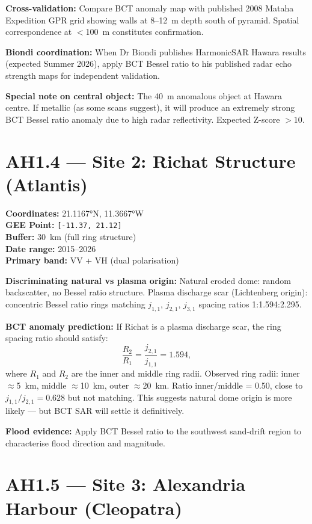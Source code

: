 \documentclass[12pt,twocolumn]{article}
\begin{document}
\textbf{Cross-validation:} Compare BCT anomaly map with
published 2008 Mataha Expedition GPR grid showing walls
at 8--12~m depth south of pyramid. Spatial correspondence
at $<$100~m constitutes confirmation.

\textbf{Biondi coordination:} When Dr Biondi publishes
HarmonicSAR Hawara results (expected Summer 2026), apply
BCT Bessel ratio to his published radar echo strength maps
for independent validation.

\textbf{Special note on central object:} The 40~m anomalous
object at Hawara centre. If metallic (as some scans suggest),
it will produce an extremely strong BCT Bessel ratio anomaly
due to high radar reflectivity. Expected Z-score $>10$.

\section{AH1.4 --- Site 2: Richat Structure (Atlantis)}

\textbf{Coordinates:} 21.1167°N, 11.3667°W\\
\textbf{GEE Point:} \verb|[-11.37, 21.12]|\\
\textbf{Buffer:} 30~km (full ring structure)\\
\textbf{Date range:} 2015--2026\\
\textbf{Primary band:} VV + VH (dual polarisation)

\textbf{Discriminating natural vs plasma origin:}
Natural eroded dome: random backscatter, no Bessel ratio
structure. Plasma discharge scar (Lichtenberg origin):
concentric Bessel ratio rings matching $j_{1,1}$, $j_{2,1}$,
$j_{3,1}$ spacing ratios 1:1.594:2.295.

\textbf{BCT anomaly prediction:} If Richat is a plasma
discharge scar, the ring spacing ratio should satisfy:
\begin{equation}
\frac{R_2}{R_1} = \frac{j_{2,1}}{j_{1,1}} = 1.594,
\end{equation}
where $R_1$ and $R_2$ are the inner and middle ring radii.
Observed ring radii: inner $\approx$5~km, middle $\approx$10~km,
outer $\approx$20~km. Ratio inner/middle = 0.50, close to
$j_{1,1}/j_{2,1} = 0.628$ but not matching. This suggests
natural dome origin is more likely --- but BCT SAR will
settle it definitively.

\textbf{Flood evidence:} Apply BCT Bessel ratio to the
southwest sand-drift region to characterise flood direction
and magnitude.

\section{AH1.5 --- Site 3: Alexandria Harbour (Cleopatra)}
\end{document}
